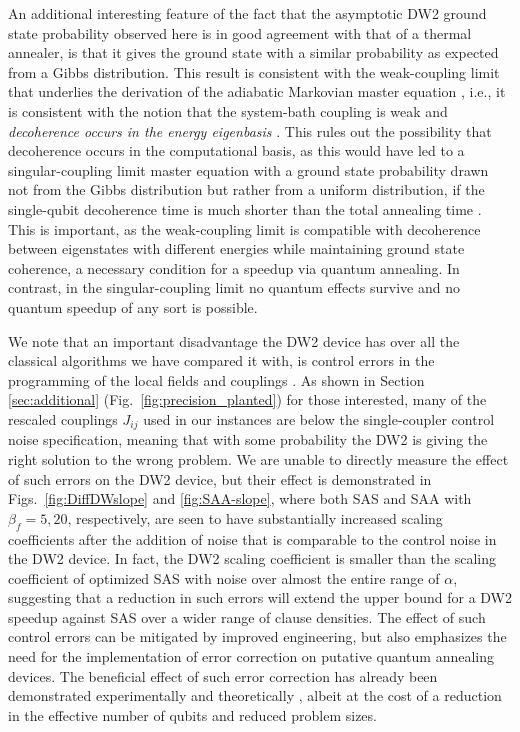 An additional interesting feature of the fact that the asymptotic DW2 ground state probability observed here is in good agreement with that of a thermal annealer, is that it gives the ground state with a similar probability as expected from a Gibbs distribution. This result is consistent with the weak-coupling limit that underlies the derivation of the adiabatic Markovian master equation \cite{ABLZ:12-SI}, i.e., it is consistent with the notion that the system-bath coupling is weak and \emph{decoherence occurs in the energy eigenbasis} \cite{childs_robustness_2001}. This rules out the possibility that decoherence occurs in the computational basis, as this would have led to a singular-coupling limit master equation with a ground state probability drawn not from the Gibbs distribution but rather from a uniform distribution, if the single-qubit decoherence time is much shorter than the total annealing time \cite{ABLZ:12-SI}. This is important, as the weak-coupling limit is compatible with decoherence between eigenstates with different energies while maintaining ground state coherence, a necessary condition for a speedup via quantum annealing. In contrast, in the singular-coupling limit no quantum effects survive and no quantum speedup of any sort is possible.

We note that an important disadvantage the DW2 device has over all the classical algorithms we have compared it with, is control errors in the programming of the local fields and couplings \cite{King:2014uq,perdomo:15a,perdomo:15b,Martin-Mayor:2015dq}.  As shown in Section \ref{sec:additional} (Fig.~\ref{fig:precision_planted}) for those interested, many of the rescaled couplings $J_{ij}$ used in our instances are below the single-coupler control noise specification, meaning that with some probability the DW2 is giving the right solution to the wrong problem. We are unable to directly measure the effect of such errors on the DW2 device, but their effect is demonstrated in Figs.~\ref{fig:DiffDWslope} and \ref{fig:SAA-slope}, where both SAS and SAA with $\beta_f=5,20$, respectively, are seen to have substantially increased scaling coefficients after the addition of noise that is comparable to the control noise in the DW2 device. In fact, the DW2 scaling coefficient is smaller than the scaling coefficient of optimized SAS with noise over almost the entire range of $\alpha$, suggesting that a reduction in such errors will extend the upper bound for a DW2 speedup against SAS over a wider range of clause densities. The effect of such control errors can be mitigated by improved engineering, but also emphasizes the need for the implementation of error correction on putative quantum annealing devices. The beneficial effect of such error correction has already been demonstrated experimentally \cite{PAL:13,PAL:14} and theoretically  \cite{Young:2013fk}, albeit at the cost of a reduction in the effective number of qubits and reduced problem sizes.

